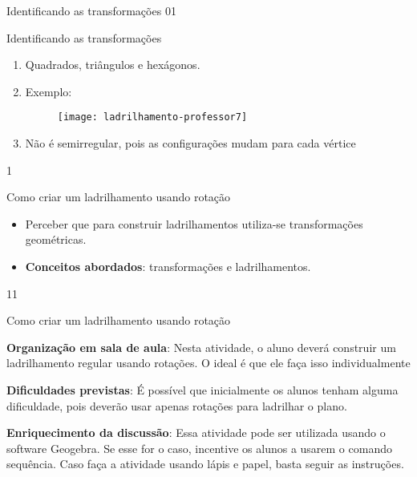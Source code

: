 {\begin{sugestions}{Identificando as transformações}
{}{0}{1}
\end{sugestions}
\begin{answer}{Identificando as transformações}
{
	\begin{enumerate}
	\item Quadrados, triângulos e hexágonos.
	\item Exemplo:
	\begin{figure}[H]
	\centering
	
	\texttt{[image: ladrilhamento-professor7]}
	\end{figure}
	\item Não é semirregular, pois as configurações mudam para cada vértice
	\end{enumerate}
}{1}
\end{answer}
\begin{objectives}{Como criar um ladrilhamento usando rotação}
{
	\begin{itemize}
	\item Perceber que para construir ladrilhamentos utiliza-se transformações geométricas.
	\item \textbf{Conceitos abordados}: transformações e ladrilhamentos.
	\end{itemize}
}{1}{1}
\end{objectives}
\begin{sugestions}{Como criar um ladrilhamento usando rotação}
{
	\textbf{Organização em sala de aula}: Nesta atividade, o aluno deverá construir um ladrilhamento regular usando rotações. O ideal é que ele faça isso individualmente

	\textbf{Dificuldades previstas}: É possível que inicialmente os alunos tenham alguma dificuldade, pois deverão usar apenas rotações para ladrilhar o plano.

	\textbf{Enriquecimento da discussão}: Essa atividade pode ser utilizada usando o software Geogebra. Se esse for o caso, incentive os alunos a usarem o comando sequência.
	Caso faça a atividade usando lápis e papel, basta seguir as instruções.

}
\end{sugestions}}
